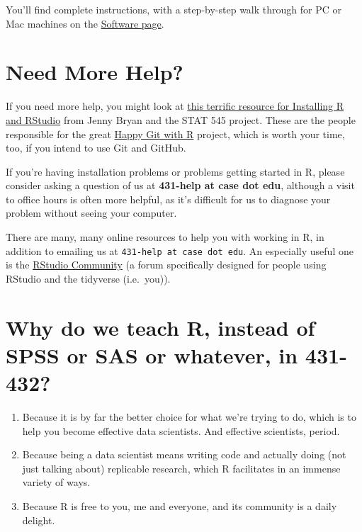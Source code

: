 \documentclass[
]{book}
\providecommand{\tightlist}{%
  \setlength{\itemsep}{0pt}\setlength{\parskip}{0pt}}
\begin{document}
You'll find complete instructions, with a step-by-step walk through for PC or Mac machines on the \href{https://github.com/THOMASELOVE/2019-431/tree/master/SOFTWARE}{Software page}.

\hypertarget{need-more-help}{%
\section{Need More Help?}\label{need-more-help}}

If you need more help, you might look at \href{http://stat545.com/block000_r-rstudio-install.html}{this terrific resource for Installing R and RStudio} from Jenny Bryan and the STAT 545 project. These are the people responsible for the great \href{http://happygitwithr.com/}{Happy Git with R} project, which is worth your time, too, if you intend to use Git and GitHub.

If you're having installation problems or problems getting started in R, please consider asking a question of us at \textbf{431-help at case dot edu}, although a visit to office hours is often more helpful, as it's difficult for us to diagnose your problem without seeing your computer.

There are many, many online resources to help you with working in R, in addition to emailing us at \texttt{431-help\ at\ case\ dot\ edu}. An especially useful one is the \href{https://community.rstudio.com/}{RStudio Community} (a forum specifically designed for people using RStudio and the tidyverse (i.e.~you)).

\hypertarget{why-do-we-teach-r-instead-of-spss-or-sas-or-whatever-in-431-432}{%
\section{Why do we teach R, instead of SPSS or SAS or whatever, in 431-432?}\label{why-do-we-teach-r-instead-of-spss-or-sas-or-whatever-in-431-432}}

\begin{enumerate}
\def\labelenumi{\arabic{enumi}.}
\tightlist
\item
  Because it is by far the better choice for what we're trying to do, which is to help you become effective data scientists. And effective scientists, period.
\item
  Because being a data scientist means writing code and actually doing (not just talking about) replicable research, which R facilitates in an immense variety of ways.
\item
  Because R is free to you, me and everyone, and its community is a daily delight.
\end{enumerate}
\end{document}

